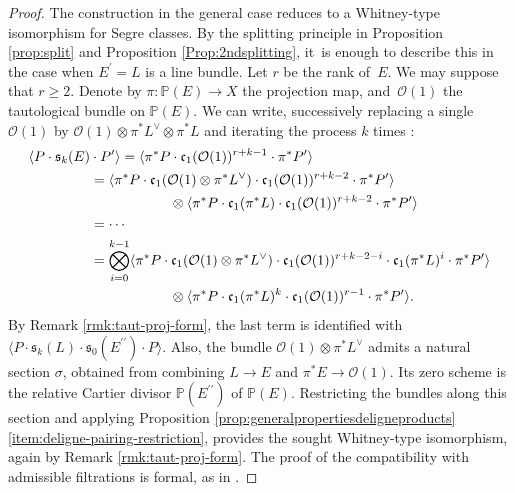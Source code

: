 \documentclass[11pt]{article}
\theoremstyle{plain}
\theoremstyle{definition}
\newcommand{\PBbb}{\mathbb P}
\newcommand{\Ocal}{\mathcal O}
\newcommand{\cfrak}{\mathfrak c}
\newcommand{\sfrak}{\mathfrak s}
\newcommand{\bis}{\prime\prime}
\begin{document}
\begin{proof}
The construction in the general case reduces to a Whitney-type isomorphism for Segre classes. By the splitting principle in Proposition \ref{prop:split} and Proposition \ref{Prop:2ndsplitting}, it~is enough to describe this in the case when $E^{\prime}=L$ is a line bundle. Let $r$ be the rank of~$E$. We may suppose that $r\geq 2$. Denote by $\pi\colon\PBbb(E)\to X$ the projection map, and~$\Ocal(1)$ the tautological bundle on $\PBbb(E)$. We can write, successively replacing a single~$\Ocal(1)$ by $\Ocal(1) \otimes \pi^{\ast} L^{\vee} \otimes \pi^\ast L $ and iterating the process $k$ times :
\begin{equation}\label{eq:SegreWhitney}
\begin{split}
\langle P \cdot \sfrak_k(E) &{}\cdot P' \rangle = \langle \pi^{\ast}P\cdot \cfrak_1(\Ocal(1))^{r+k-1} \cdot \pi^{\ast}P' \rangle \\
&= \langle \pi^{\ast}P\cdot \cfrak_1(\Ocal(1) \otimes \pi^{\ast}L^\vee) \cdot \cfrak_1(\Ocal(1))^{r+k-2}\cdot \pi^{\ast}P' \rangle\\
&\hspace*{2cm}\otimes \langle \pi^{\ast}P\cdot \cfrak_1(\pi^{\ast}L)\cdot\cfrak_1(\Ocal(1))^{r+k-2} \cdot \pi^{\ast}P' \rangle \\
&=\cdots\\
&= \bigotimes_{i=0}^{k-1} \langle \pi^{\ast}P \cdot \cfrak_1(\Ocal(1) \otimes \pi^{\ast} L^\vee) \cdot \cfrak_1(\Ocal(1))^{r+k-2-i} \cdot \cfrak_1(\pi^\ast L)^{i} \cdot \pi^{\ast}P'\rangle \\
&\hspace*{2cm}\otimes \langle \pi^{\ast}P \cdot \cfrak_1(\pi^\ast L)^{k} \cdot \cfrak_1(\Ocal(1))^{r-1} \cdot \pi^{\ast}P'\rangle.
\end{split}
\end{equation}
By Remark \ref{rmk:taut-proj-form}, the last term is identified with $\langle P \cdot \sfrak_k(L) \cdot \sfrak_0(E^{\bis}) \cdot P \rangle$. Also, the bundle $\Ocal(1) \otimes \pi^\ast L^\vee$ admits a natural section $\sigma$, obtained from combining $L \to E$ and $\pi^\ast E \to \Ocal(1)$. Its zero scheme is the relative Cartier divisor $\PBbb(E^{\bis})$ of $\PBbb(E)$. Restricting the bundles along this section and applying Proposition \ref{prop:generalpropertiesdeligneproducts}\eqref{item:deligne-pairing-restriction}, provides the sought Whitney-type isomorphism, again by Remark \ref{rmk:taut-proj-form}. The proof of the compatibility with admissible filtrations is formal, as in \cite[\textsection V.2.3]{Elkikfib}.


\end{proof}
\end{document}

